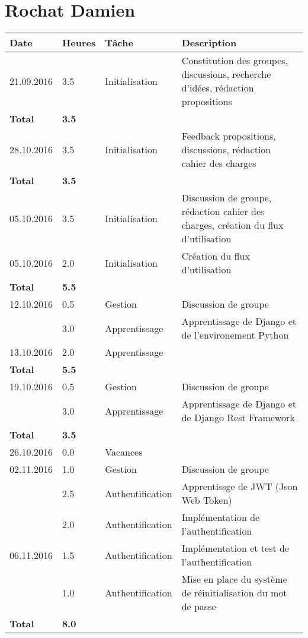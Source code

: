 \documentclass[french]{article}
\begin{document}
	\section*{Rochat Damien}
	\begin{longtable}{p{}|p{}|p{}|p{}}
		Date & Heures & Tâche & Description \\
		\hline
		
		\hline
		21.09.2016 & 3.5 & Initialisation & Constitution des groupes, discussions, recherche d'idées, rédaction propositions \\
		\textbf{Total} & \textbf{3.5} && \\
		
		\hline
		28.10.2016 & 3.5 & Initialisation & Feedback propositions, discussions, rédaction cahier des charges \\
		\textbf{Total} & \textbf{3.5} && \\
		
		\hline
		05.10.2016 & 3.5 & Initialisation & Discussion de groupe, rédaction cahier des charges, création du flux d'utilisation \\
		05.10.2016 & 2.0 & Initialisation & Création du flux d'utilisation \\
		\textbf{Total} & \textbf{5.5} && \\
		
		\hline
		12.10.2016 & 0.5 & Gestion & Discussion de groupe \\
			       & 3.0 & Apprentissage & Apprentissage de Django et de l'environement Python \\
		13.10.2016 & 2.0 & \multicolumn{2}{l}{Apprentissage} \\
		\textbf{Total} & \textbf{5.5} && \\
		
		\hline
		19.10.2016 & 0.5 & Gestion & Discussion de groupe \\
				   & 3.0 & Apprentissage & Apprentissage de Django et de Django Rest Framework \\
		\textbf{Total} & \textbf{3.5} && \\
		
		\hline
		26.10.2016 & 0.0 & \multicolumn{2}{l}{Vacances} \\
		
		\hline
		02.11.2016 & 1.0 & Gestion & Discussion de groupe \\
			       & 2.5 & Authentification & Apprentissge de JWT (Json Web Token) \\
  			       & 2.0 & Authentification & Implémentation de l'authentification \\
		06.11.2016 & 1.5 & Authentification & Implémentation et test de l'authentification \\
				   & 1.0 & Authentification & Mise en place du système de réinitialisation du mot de passe \\
		\textbf{Total} & \textbf{8.0} && \\
		

\end{longtable}
\end{document}
